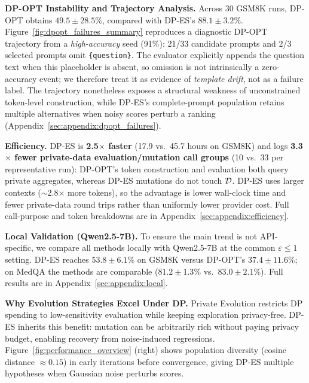 \begingroup
\setlength{\textfloatsep}{4pt}
\setlength{\floatsep}{4pt}
\setlength{\intextsep}{4pt}

\endgroup

\noindent\textbf{DP-OPT Instability and Trajectory Analysis.}
Across 30 GSM8K runs, DP-OPT obtains $49.5{\pm}28.5\%$, compared with DP-ES's $88.1{\pm}3.2\%$. Figure~\ref{fig:dpopt_failures_summary} reproduces a diagnostic DP-OPT trajectory from a \emph{high-accuracy} seed (91\%): 21/33 candidate prompts and 2/3 selected prompts omit \texttt{\{question\}}. The evaluator explicitly appends the question text when this placeholder is absent, so omission is not intrinsically a zero-accuracy event; we therefore treat it as evidence of \emph{template drift}, not as a failure label. The trajectory nonetheless exposes a structural weakness of unconstrained token-level construction, while DP-ES's complete-prompt population retains multiple alternatives when noisy scores perturb a ranking (Appendix~\ref{sec:appendix:dpopt_failures}).



\noindent\textbf{Efficiency.}
DP-ES is \textbf{2.5$\times$ faster} (17.9 vs.\ 45.7 hours on GSM8K) and logs \textbf{3.3$\times$ fewer private-data evaluation/mutation call groups} (10 vs.\ 33 per representative run): DP-OPT's token construction and evaluation both query private aggregates, whereas DP-ES mutations do not touch $\mathcal{D}$. DP-ES uses larger contexts ($\sim$2.8$\times$ more tokens), so the advantage is lower wall-clock time and fewer private-data round trips rather than uniformly lower provider cost. Full call-purpose and token breakdowns are in Appendix~\ref{sec:appendix:efficiency}.

\noindent\textbf{Local Validation (Qwen2.5-7B).}
To ensure the main trend is not API-specific, we compare all methods locally with Qwen2.5-7B at the common $\varepsilon\leq1$ setting. DP-ES reaches $53.8\pm6.1$\% on GSM8K versus DP-OPT's $37.4\pm11.6$\%; on MedQA the methods are comparable ($81.2\pm1.3$\% vs.\ $83.0\pm2.1$\%). Full results are in Appendix~\ref{sec:appendix:local}.

\noindent\textbf{Why Evolution Strategies Excel Under DP.}
Private Evolution \cite{lin2024dpsda_images,xie2024dpsda_text,lin2025simpe} restricts DP spending to low-sensitivity evaluation while keeping exploration privacy-free. DP-ES inherits this benefit: mutation can be arbitrarily rich without paying privacy budget, enabling recovery from noise-induced regressions. Figure~\ref{fig:performance_overview} (right) shows population diversity (cosine distance $\approx0.15$) in early iterations before convergence, giving DP-ES multiple hypotheses when Gaussian noise perturbs scores.

